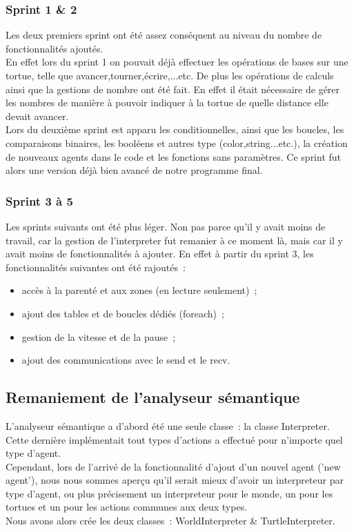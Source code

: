 \subsubsection{Sprint 1 \& 2}
Les deux premiers sprint ont été assez conséquent au niveau du nombre de fonctionnalités ajoutés.\\
En effet lors du sprint 1 on pouvait déjà effectuer les opérations de bases sur une tortue, telle que avancer,tourner,écrire,...etc. De plus les opérations de calculs ainsi que la gestions de nombre ont été fait. En effet il était nécessaire de gérer les nombres de manière à pouvoir indiquer à la tortue de quelle distance elle devait avancer.\\

Lors du deuxième sprint est apparu les conditionnelles, ainsi que les boucles, les comparaisons binaires, les booléens et autres type (color,string...etc.), la création de nouveaux agents dans le code et les fonctions sans paramètres. Ce sprint fut alors une version déjà bien avancé de notre programme final.


\subsubsection{Sprint 3 à 5}
Les sprints suivants ont été plus léger. Non pas parce qu'il y avait moins de travail, car la gestion de l'interpreter fut remanier à ce moment là, mais car il y avait moins de fonctionnalités à ajouter. En effet à partir du sprint 3, les fonctionnalités suivantes ont été rajoutés~:
\begin{itemize}
\item accès à la parenté et aux zones (en lecture seulement)~;
\item ajout des tables et de boucles dédiés (foreach)~;
\item gestion de la vitesse et de la pause~;
\item ajout des communications avec le send et le recv.
\end{itemize}


\subsection{Remaniement de l'analyseur sémantique}
\label{remaniementInterpreter}

L'analyseur sémantique a d'abord été une seule classe~: la classe Interpreter.\\
Cette dernière implémentait tout types d'actions a effectué pour n'importe quel type d'agent.\\
Cependant, lors de l'arrivé de la fonctionnalité d'ajout d'un nouvel agent ('new agent'), nous nous sommes aperçu qu'il serait mieux d'avoir un interpreteur par type d'agent, ou plus précisement un interpreteur pour le monde, un pour les tortues et un pour les actions communes aux deux types.\\
Nous avons alors crée les deux classes~: WorldInterpreter \& TurtleInterpreter.\\

